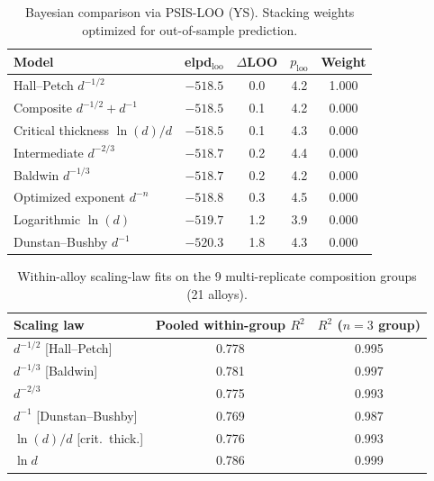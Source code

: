 \documentclass[11pt]{article}
\begin{document}
\begin{table}[htb]
\centering
\caption{Bayesian comparison via PSIS-LOO (YS). Stacking weights optimized for out-of-sample prediction.}
\label{tab:bayesian_scaling}
\small
\begin{tabular}{lcccc}
\toprule
Model & elpd$_\text{loo}$ & $\Delta$LOO & $p_\text{loo}$ & Weight \\
\midrule
Hall--Petch $d^{-1/2}$              & $-518.5$ & 0.0 & 4.2 & 1.000 \\
Composite $d^{-1/2}\!+\!d^{-1}$     & $-518.5$ & 0.1 & 4.2 & 0.000 \\
Critical thickness $\ln(d)/d$       & $-518.5$ & 0.1 & 4.3 & 0.000 \\
Intermediate $d^{-2/3}$              & $-518.7$ & 0.2 & 4.4 & 0.000 \\
Baldwin $d^{-1/3}$                  & $-518.7$ & 0.2 & 4.2 & 0.000 \\
Optimized exponent $d^{-n}$         & $-518.8$ & 0.3 & 4.5 & 0.000 \\
Logarithmic $\ln(d)$                & $-519.7$ & 1.2 & 3.9 & 0.000 \\
Dunstan--Bushby $d^{-1}$            & $-520.3$ & 1.8 & 4.3 & 0.000 \\
\bottomrule
\end{tabular}
\end{table}

\begin{table}[htb]
\centering
\caption{Within-alloy scaling-law fits on the 9 multi-replicate composition groups (21 alloys).}
\label{tab:within_alloy_scaling}
\small
\begin{tabular}{lcc}
\toprule
Scaling law & Pooled within-group $R^2$ & $R^2$ ($n{=}3$ group) \\
\midrule
$d^{-1/2}$ [Hall--Petch]   & 0.778 & 0.995 \\
$d^{-1/3}$ [Baldwin]       & 0.781 & 0.997 \\
$d^{-2/3}$                 & 0.775 & 0.993 \\
$d^{-1}$ [Dunstan--Bushby] & 0.769 & 0.987 \\
$\ln(d)/d$ [crit.\ thick.] & 0.776 & 0.993 \\
$\ln d$                    & 0.786 & 0.999 \\
\bottomrule
\end{tabular}
\end{table}
\end{document}
